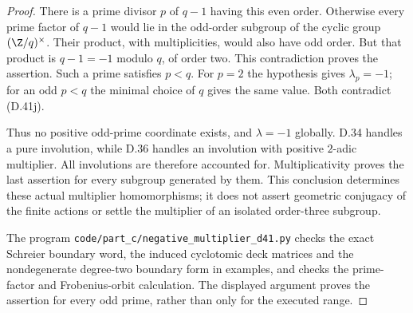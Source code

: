 \begin{proof}
There is a prime divisor $p$ of $q-1$ having this even
order.  Otherwise every prime factor of $q-1$ would
lie in the odd-order subgroup of the cyclic group
$(\Z/q)^\times$.  Their product, with multiplicities,
would also have odd order.  But that product is
$q-1=-1$ modulo $q$, of order two.  This contradiction
proves the assertion.  Such a prime satisfies $p<q$.
For $p=2$ the hypothesis gives $\lambda_p=-1$; for an
odd $p<q$ the minimal choice of $q$ gives the same
value.  Both contradict (D.41j).

Thus no positive odd-prime coordinate exists, and
$\lambda=-1$ globally.  D.34 handles a pure
involution, while D.36 handles an involution with
positive $2$-adic multiplier.  All involutions are
therefore accounted for.  Multiplicativity proves
the last assertion for every subgroup generated by
them.  This conclusion determines these actual
multiplier homomorphisms; it does not assert geometric
conjugacy of the finite actions or settle the
multiplier of an isolated order-three subgroup.

The program \texttt{code/part\_c/negative\_multiplier\_d41.py}
checks the exact Schreier boundary word, the induced
cyclotomic deck matrices and the nondegenerate
degree-two boundary form in examples, and checks
the prime-factor and Frobenius-orbit calculation.
The displayed argument proves the assertion for
every odd prime, rather than only for the executed
range.
\end{proof}

